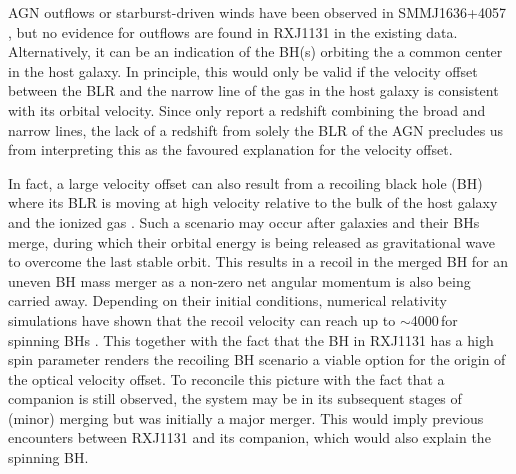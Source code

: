 \documentclass[]{emulateapj}
\begin{document}
AGN outflows or starburst-driven winds have been observed
in \eg SMMJ1636+4057 \citep[][]{Swinbank05a}, but 
no evidence for outflows are found in RXJ1131 in the existing data. 
Alternatively, it can be an indication of the BH(s) orbiting the a common center in
the host galaxy.
In principle, this would only be valid if the velocity offset between the BLR and 
the narrow line of the gas in the host galaxy is consistent with its orbital velocity. 
Since \citet{Sluse03a} only report a redshift combining the broad and narrow lines, 
the lack of a redshift from solely the BLR of the AGN precludes us from interpreting this as the favoured
explanation for the velocity offset.

In fact, a large velocity offset can also result from a recoiling black hole (BH) where its
BLR is moving at high velocity relative to the bulk of the host galaxy and
the ionized gas \citep{Madau04a, Bonning07a, Loeb07a}. %
Such a scenario may occur after galaxies and their BHs merge, during which 
their orbital energy is being released as gravitational wave to overcome the last stable orbit.
This results in a recoil in the merged BH for an uneven BH mass merger as a
non-zero net angular momentum is also being carried away.
Depending on their initial conditions, %
numerical relativity simulations have shown that
the recoil velocity can reach up to $\sim$4000\,\kms for spinning BHs \citep[\eg][]{Campanelli07a}.
This together with the fact that the BH in RXJ1131 has a high spin parameter \citep{Reis14a} 
renders the recoiling BH scenario a viable option for the origin
of the optical velocity offset.
To reconcile this picture with the fact that a companion is still observed, 
the system may be in its subsequent stages of (minor) merging but was initially
a major merger. 
This would imply previous encounters between RXJ1131 and its companion, 
which would also explain the spinning BH.
\end{document}
